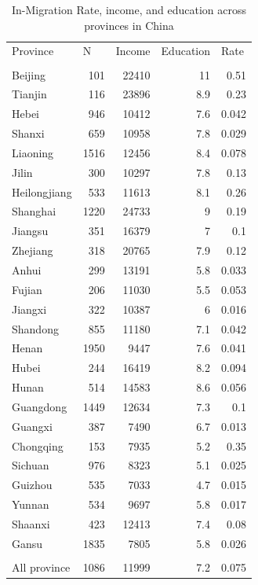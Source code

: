 \documentclass{article}
\begin{document}
\begin{table}[htbp]
  \centering
  \caption{In-Migration Rate, income, and education across provinces in China}
    \begin{tabular}{lrrrr}
              &       &       &       &  \\
    \toprule
    Province & \multicolumn{1}{l}{N} & \multicolumn{1}{l}{Income} & \multicolumn{1}{l}{Education} & \multicolumn{1}{l}{ Rate} \\
    \midrule
          &       &       &       &  \\
    Beijing & 101   & 22410 & 11    & 0.51 \\
    Tianjin & 116   & 23896 & 8.9   & 0.23 \\
    Hebei & 946   & 10412 & 7.6   & 0.042 \\
    Shanxi & 659   & 10958 & 7.8   & 0.029 \\
    Liaoning & 1516  & 12456 & 8.4   & 0.078 \\
    Jilin & 300   & 10297 & 7.8   & 0.13 \\
    Heilongjiang & 533   & 11613 & 8.1   & 0.26 \\
    Shanghai & 1220  & 24733 & 9     & 0.19 \\
    Jiangsu & 351   & 16379 & 7     & 0.1 \\
    Zhejiang & 318   & 20765 & 7.9   & 0.12 \\
    Anhui & 299   & 13191 & 5.8   & 0.033 \\
    Fujian & 206   & 11030 & 5.5   & 0.053 \\
    Jiangxi & 322   & 10387 & 6     & 0.016 \\
    Shandong & 855   & 11180 & 7.1   & 0.042 \\
    Henan & 1950  & 9447  & 7.6   & 0.041 \\
    Hubei & 244   & 16419 & 8.2   & 0.094 \\
    Hunan & 514   & 14583 & 8.6   & 0.056 \\
    Guangdong & 1449  & 12634 & 7.3   & 0.1 \\
    Guangxi & 387   & 7490  & 6.7   & 0.013 \\
    Chongqing & 153   & 7935  & 5.2   & 0.35 \\
    Sichuan & 976   & 8323  & 5.1   & 0.025 \\
    Guizhou & 535   & 7033  & 4.7   & 0.015 \\
    Yunnan & 534   & 9697  & 5.8   & 0.017 \\
    Shaanxi & 423   & 12413 & 7.4   & 0.08 \\
    Gansu & 1835  & 7805  & 5.8   & 0.026 \\
          &       &       &       &  \\
    \midrule
    All province & 1086  & 11999 & 7.2   & 0.075 \\
    \bottomrule
    \end{tabular}%
  \label{table1}%
\end{table}%
\end{document}
